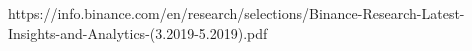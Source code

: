 https://info.binance.com/en/research/selections/Binance-Research-Latest-Insights-and-Analytics-(3.2019-5.2019).pdf